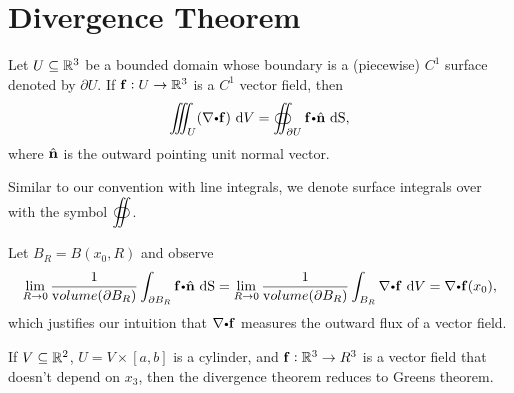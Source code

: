   \section{Divergence Theorem}


  \begin{theorem}
    Let $U \subseteq \mathbb{R}^3$ be a bounded domain whose boundary is a (piecewise) $C^1$ surface denoted by $\partial U$.
    If $\mathbf{ f}:U \to \mathbb{R}^3$ is a $C^1$ vector field, then
    \begin{equation*}
      \diiint_U (\grad \bp \vector{f}) \, \d V = \doiint_{\partial U} \vector{f} \bp \hat{ \vector{n}} \,  \d \S,
    \end{equation*}
    where $\hat{ \mathbf{ n}}$ is the outward pointing unit normal vector.
  \end{theorem}

  \begin{remark}
    Similar to our convention with line integrals, we denote surface integrals over  with the symbol $\displaystyle\oiint$.
  \end{remark}

  \begin{remark}
    Let $B_R = B(x_0, R)$ and observe
    \begin{equation*}
      \lim_{R \to 0} \dfrac{1}{\vol{\partial B_R}} \dint_{\partial B_R} \vector{f} \bp \hat{ \vector{n}} \,  \d \S
      = \lim_{R \to 0} \dfrac{1}{\vol{\partial B_R}} \dint_{B_R} \grad \bp \vector{f} \, \d V = \grad \bp \vector{f}(x_0),
    \end{equation*}
    which justifies our intuition that $\grad \bp \vector{f}$ measures the outward flux of a vector field.
  \end{remark}

  \begin{remark}
    If $V \subseteq \mathbb{R}^2$, $U = V \times [a, b]$ is a cylinder, and $\mathbf{ f}:\mathbb{R}^3 \to R^3$ is a vector field that doesn't depend on $x_3$, then the divergence theorem reduces to Greens theorem.
  \end{remark}

